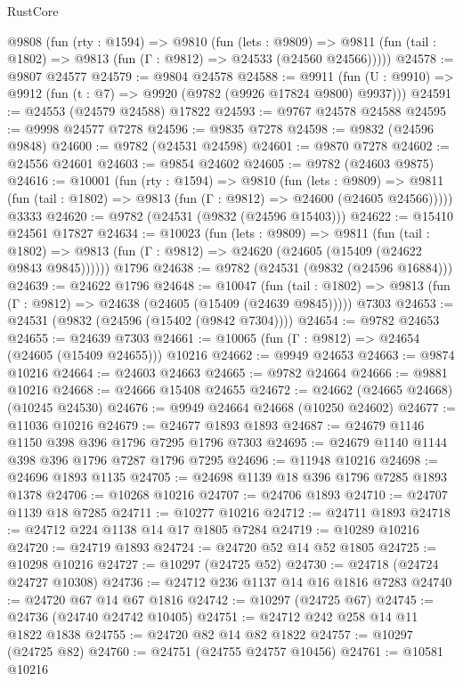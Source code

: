 \begin{lexlean}{RustCore}
\begin{coremodule}
  @9808
    (fun (rty : @1594) =>
    @9810
      (fun (lets : @9809) =>
      @9811 (fun (tail : @1802) => @9813 (fun (Γ : @9812) => @24533 (@24560 @24566)))))
@24578 := @9807 @24577
@24579 := @9804 @24578
@24588 := @9911
    (fun (U : @9910) => @9912 (fun (t : @7) => @9920 (@9782 (@9926 @17824 @9800) @9937)))
@24591 := @24553 (@24579 @24588) @17822
@24593 := @9767 @24578 @24588
@24595 := @9998 @24577 @7278
@24596 := @9835 @7278
@24598 := @9832 (@24596 @9848)
@24600 := @9782 (@24531 @24598)
@24601 := @9870 @7278
@24602 := @24556 @24601
@24603 := @9854 @24602
@24605 := @9782 (@24603 @9875)
@24616 := @10001
    (fun (rty : @1594) =>
    @9810
      (fun (lets : @9809) =>
      @9811 (fun (tail : @1802) => @9813 (fun (Γ : @9812) => @24600 (@24605 @24566)))))
    @3333
@24620 := @9782 (@24531 (@9832 (@24596 @15403)))
@24622 := @15410 @24561 @17827
@24634 := @10023
    (fun (lets : @9809) =>
    @9811
      (fun (tail : @1802) =>
      @9813 (fun (Γ : @9812) => @24620 (@24605 (@15409 (@24622 @9843 @9845))))))
    @1796
@24638 := @9782 (@24531 (@9832 (@24596 @16884)))
@24639 := @24622 @1796
@24648 := @10047
    (fun (tail : @1802) => @9813 (fun (Γ : @9812) => @24638 (@24605 (@15409 (@24639 @9845)))))
    @7303
@24653 := @24531 (@9832 (@24596 (@15402 (@9842 @7304))))
@24654 := @9782 @24653
@24655 := @24639 @7303
@24661 := @10065 (fun (Γ : @9812) => @24654 (@24605 (@15409 @24655))) @10216
@24662 := @9949 @24653
@24663 := @9874 @10216
@24664 := @24603 @24663
@24665 := @9782 @24664
@24666 := @9881 @10216
@24668 := @24666 @15408 @24655
@24672 := @24662 (@24665 @24668) (@10245 @24530)
@24676 := @9949 @24664 @24668 (@10250 @24602)
@24677 := @11036 @10216
@24679 := @24677 @1893 @1893
@24687 := @24679 @1146 @1150 @398 @396 @1796 @7295 @1796 @7303
@24695 := @24679 @1140 @1144 @398 @396 @1796 @7287 @1796 @7295
@24696 := @11948 @10216
@24698 := @24696 @1893 @1135
@24705 := @24698 @1139 @18 @396 @1796 @7285 @1893 @1378
@24706 := @10268 @10216
@24707 := @24706 @1893
@24710 := @24707 @1139 @18 @7285
@24711 := @10277 @10216
@24712 := @24711 @1893
@24718 := @24712 @224 @1138 @14 @17 @1805 @7284
@24719 := @10289 @10216
@24720 := @24719 @1893
@24724 := @24720 @52 @14 @52 @1805
@24725 := @10298 @10216
@24727 := @10297 (@24725 @52)
@24730 := @24718 (@24724 @24727 @10308)
@24736 := @24712 @236 @1137 @14 @16 @1816 @7283
@24740 := @24720 @67 @14 @67 @1816
@24742 := @10297 (@24725 @67)
@24745 := @24736 (@24740 @24742 @10405)
@24751 := @24712 @242 @258 @14 @11 @1822 @1838
@24755 := @24720 @82 @14 @82 @1822
@24757 := @10297 (@24725 @82)
@24760 := @24751 (@24755 @24757 @10456)
@24761 := @10581 @10216

\end{coremodule}
\end{lexlean}

